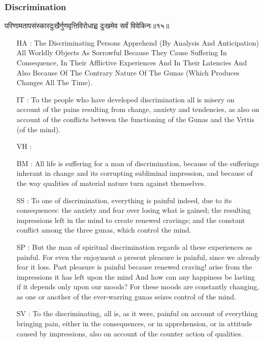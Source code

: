 \begin{frame}[fragile]\frametitle{Discrimination}
\begin{sanskrit}
परिणामतापसंस्कारदुःखैर्गुणवृत्तिविरोधाच्च दुःखमेव सर्वं विवेकिनः॥१५॥
\end{sanskrit}

	\begin{itemize}
	\item [HA]: The Discriminating Persons Apprehend (By Analysis And Anticipation) All Worldly Objects As Sorrowful Because They Cause Suffering In Consequence, In Their Afflictive Experiences And In Their Latencies And Also Because Of The Contrary Nature Of The Gunas (Which Produces Changes All The Time).
	\item [IT]: To the people who have developed discrimination all is misery on account of the pains resulting from change, anxiety and tendencies, as also on account of the conflicts between the functioning of the Gunas and the Vrttis (of the mind).
	\item [VH]: 
	\item [BM]: All life is suffering for a man of discrimination, because of the sufferings inherant in change and its corrupting subliminal impression, and because of the way qualities of material nature turn against themselves.
	\item [SS]: To one of discrimination, everything is painful indeed, due to its consequences: the anxiety and fear over losing what is gained; the resulting impressions left in the mind to create renewed cravings; and the constant conflict among the three gunas, which control the mind.
	\item [SP]: But the man of spiritual discrimination regards al these experiences as painful. For even the enjoyment o present pleasure is painful, since we already fear it loss. Past pleasure is painful because renewed craving! arise from the impressions it has left upon the mind And how can any happiness be lasting if it depends only upon our moods? For these moods are constantly changing, as one or another of the ever-warring gunas seizes control of the mind.
	\item [SV]: To the discriminating, all is, as it were, painful on account of everything bringing pain, either in the consequences, or in apprehension, or in attitude caused by impressions, also on account of the counter action of qualities. 
	\end{itemize}
\end{frame}


